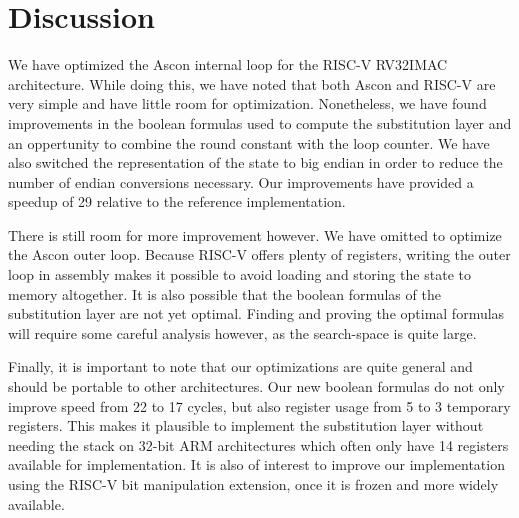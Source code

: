 \section{Discussion}

We have optimized the Ascon internal loop for the RISC-V RV32IMAC architecture.
While doing this, we have noted that both Ascon and RISC-V are very simple and
have little room for optimization. Nonetheless, we have found improvements in
the boolean formulas used to compute the substitution layer and an oppertunity
to combine the round constant with the loop counter. We have also switched the
representation of the state to big endian in order to reduce the number of
endian conversions necessary. Our improvements have provided a speedup of 29%
relative to the reference implementation.

There is still room for more improvement however. We have omitted to optimize
the Ascon outer loop. Because RISC-V offers plenty of registers, writing the
outer loop in assembly makes it possible to avoid loading and storing the state
to memory altogether. It is also possible that the boolean formulas of the
substitution layer are not yet optimal. Finding and proving the optimal formulas
will require some careful analysis however, as the search-space is quite large.

Finally, it is important to note that our optimizations are quite general and
should be portable to other architectures. Our new boolean formulas do not only
improve speed from 22 to 17 cycles, but also register usage from 5 to 3
temporary registers. This makes it plausible to implement the substitution layer
without needing the stack on 32-bit ARM architectures which often only have 14
registers available for implementation. It is also of interest to improve our
implementation using the RISC-V bit manipulation extension, once it is frozen
and more widely available.
